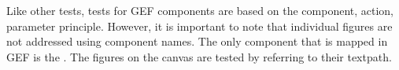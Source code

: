 Like other \jb{} tests, tests for GEF components are based on the component, action, parameter principle. However, it is important to note that individual figures are not addressed using component names. The only component that is mapped in GEF is the .  The figures on the canvas are tested by referring to their textpath. 
